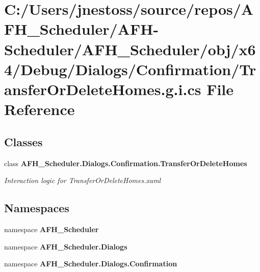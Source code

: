 \section{C\+:/\+Users/jnestoss/source/repos/\+A\+F\+H\+\_\+\+Scheduler/\+A\+F\+H-\/\+Scheduler/\+A\+F\+H\+\_\+\+Scheduler/obj/x64/\+Debug/\+Dialogs/\+Confirmation/\+Transfer\+Or\+Delete\+Homes.g.\+i.\+cs File Reference}
\label{x64_2_debug_2_dialogs_2_confirmation_2_transfer_or_delete_homes_8g_8i_8cs}
\subsection*{Classes}
\begin{DoxyCompactItemize}
\item 
class \textbf{ A\+F\+H\+\_\+\+Scheduler.\+Dialogs.\+Confirmation.\+Transfer\+Or\+Delete\+Homes}
\begin{DoxyCompactList}\small\item\em Interaction logic for Transfer\+Or\+Delete\+Homes.\+xaml \end{DoxyCompactList}\end{DoxyCompactItemize}
\subsection*{Namespaces}
\begin{DoxyCompactItemize}
\item 
namespace \textbf{ A\+F\+H\+\_\+\+Scheduler}
\item 
namespace \textbf{ A\+F\+H\+\_\+\+Scheduler.\+Dialogs}
\item 
namespace \textbf{ A\+F\+H\+\_\+\+Scheduler.\+Dialogs.\+Confirmation}
\end{DoxyCompactItemize}
